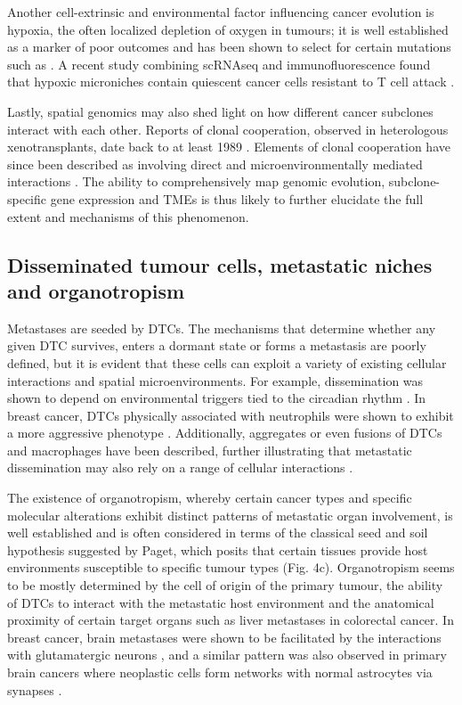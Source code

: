 Another cell-extrinsic and environmental factor influencing cancer evolution is hypoxia, the often localized depletion of oxygen in tumours; it is well established as a marker of poor outcomes \parencite{Harris2002-ty} and has been shown to select for certain mutations such as  \parencite{Graeber1996-em}. A recent study combining \ac{scRNAseq} and immunofluorescence found that hypoxic microniches contain quiescent cancer cells resistant to T cell attack \parencite{Baldominos2022-xe}.

Lastly, spatial genomics may also shed light on how different cancer subclones interact with each other. Reports of clonal cooperation, observed in heterologous xenotransplants, date back to at least 1989 \parencite{Miller1989-hp}. Elements of clonal cooperation have since been described as involving direct and microenvironmentally mediated interactions \parencite{Alonso-Curbelo2021-dq,Cleary2014-hg,Zhou2017-nm,Tammela2017-nd,Williams2020-fj}. The ability to comprehensively map genomic evolution, subclone-specific gene expression and \ac{TME}s is thus likely to further elucidate the full extent and mechanisms of this phenomenon.

\subsection*{Disseminated tumour cells, metastatic niches and organotropism}

Metastases are seeded by \acp{DTC}. The mechanisms that determine whether any given \ac{DTC} survives, enters a dormant state or forms a metastasis are poorly defined, but it is evident that these cells can exploit a variety of existing cellular interactions and spatial microenvironments. For example, dissemination was shown to depend on environmental triggers tied to the circadian rhythm \parencite{Diamantopoulou2022-sb}. In breast cancer, \acp{DTC} physically associated with neutrophils were shown to exhibit a more aggressive phenotype \parencite{Szczerba2019-mt}. Additionally, aggregates or even fusions of \acp{DTC} and macrophages have been described, further illustrating that metastatic dissemination may also rely on a range of cellular interactions \parencite{Adams2014-xq}.

The existence of organotropism, whereby certain cancer types and specific molecular alterations exhibit distinct patterns of metastatic organ involvement, is well established and is often considered in terms of the classical seed and soil hypothesis suggested by Paget, which posits that certain tissues provide host environments susceptible to specific tumour types \parencite{Fidler2003-lh,Paget1889-ha} (Fig. 4c). Organotropism seems to be mostly determined by the cell of origin of the primary tumour, the ability of \acp{DTC} to interact with the metastatic host environment and the anatomical proximity of certain target organs such as liver metastases in colorectal cancer. In breast cancer, brain metastases were shown to be facilitated by the interactions with glutamatergic neurons \parencite{Zeng2019-vf}, and a similar pattern was also observed in primary brain cancers where neoplastic cells form networks with normal astrocytes via synapses \parencite{Venkataramani2022-kg}.

